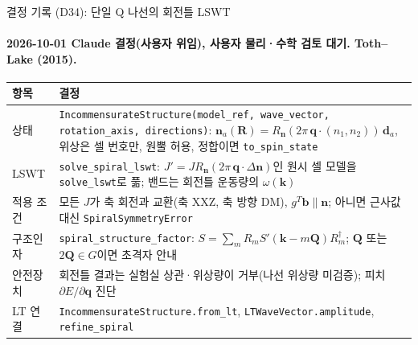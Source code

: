 \begin{frame}[label=decisions-d34]{결정 기록 (D34): 단일 Q 나선의 회전틀 LSWT}
  \framesubtitle{2026-10-01 Claude 결정(사용자 위임), 사용자 물리·수학 검토 대기. Toth--Lake (2015).}
  \small\renewcommand{\arraystretch}{1.12}
  \begin{tabularx}{\textwidth}{@{}P{3.0cm}Y@{}}
    \toprule
    항목 & 결정 \\
    \midrule
    상태 & \texttt{IncommensurateStructure(model\_ref, wave\_vector, rotation\_axis, directions)}: $\mathbf n_a(\mathbf R)=R_{\mathbf n}(2\pi\,\mathbf q\cdot(n_1,n_2))\,\mathbf d_a$, 위상은 셀 번호만, 원뿔 허용, 정합이면 \texttt{to\_spin\_state} \\
    LSWT & \texttt{solve\_spiral\_lswt}: $J'=J R_{\mathbf n}(2\pi\,\mathbf q\cdot\Delta\mathbf n)$인 원시 셀 모델을 \texttt{solve\_lswt}로 풂; 밴드는 회전틀 운동량의 $\omega(\mathbf k)$ \\
    적용 조건 & 모든 $J$가 축 회전과 교환(축 XXZ, 축 방향 DM), $g^T\mathbf b\parallel\mathbf n$; 아니면 근사값 대신 \texttt{SpiralSymmetryError} \\
    구조인자 & \texttt{spiral\_structure\_factor}: $S=\sum_m R_m S'(\mathbf k-m\mathbf Q)R_m^\dagger$; $\mathbf Q$ 또는 $2\mathbf Q\in G$이면 초격자 안내 \\
    안전장치 & 회전틀 결과는 실험실 상관·위상량이 거부(나선 위상량 미검증); 피치 $\partial E/\partial\mathbf q$ 진단 \\
    LT 연결 & \texttt{IncommensurateStructure.from\_lt}, \texttt{LTWaveVector.amplitude}, \texttt{refine\_spiral} \\
    \bottomrule
  \end{tabularx}
  \par\smallskip
\end{frame}


